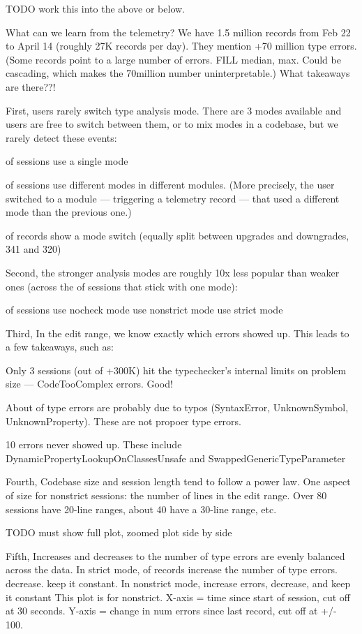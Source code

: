 \documentclass[english,submission,cleveref]{programming}
\begin{document}
TODO work this into the above or below.

What can we learn from the telemetry? We have 1.5 million records from Feb 22
to April 14 (roughly 27K records per day).
They mention +70 million type errors.
(Some records point to a large number of errors. FILL median, max. Could be cascading,
which makes the 70million number uninterpretable.)
What takeaways are there??!

First,
users rarely switch type analysis mode. There are 3 modes available and users
are free to switch between them, or to mix modes in a codebase, but we rarely
detect these events:

 of sessions use a single mode

 of sessions use different modes in different modules. (More
precisely, the user switched to a module --- triggering a telemetry record ---
that used a different mode than the previous one.)

 of records show a mode switch (equally split between upgrades and
downgrades, 341 and 320)


Second,
the stronger analysis modes are roughly 10x less popular than weaker ones
(across the  of sessions that stick with one mode):

 of sessions use nocheck mode
 use nonstrict mode
 use strict mode

Third,
In the edit range, we know exactly which errors showed up. This leads to a few
takeaways, such as:

Only 3 sessions (out of +300K) hit the typechecker's internal limits on problem
size --- CodeTooComplex errors. Good!

About  of type errors are probably due to typos (SyntaxError, UnknownSymbol,
UnknownProperty). These are not propoer type errors.

10 errors never showed up. These include DynamicPropertyLookupOnClassesUnsafe and
SwappedGenericTypeParameter


Fourth,
Codebase size and session length tend to follow a power law. 
One aspect of size for nonstrict sessions: the number of
lines in the edit range. Over 80 sessions have 20-line ranges, about 40 have a
30-line range, etc.

TODO must show full plot, zoomed plot side by side

Fifth,
Increases and decreases to the number of type errors are evenly balanced across
the data.
In strict mode,  of records increase the number of type errors. 
decrease.  keep it constant.
In nonstrict mode,  increase errors,  decrease, and 
keep it constant
This plot is for nonstrict. X-axis = time since start of session, cut off at 30
seconds. Y-axis = change in num errors since last record, cut off at +/- 100.
\end{document}
